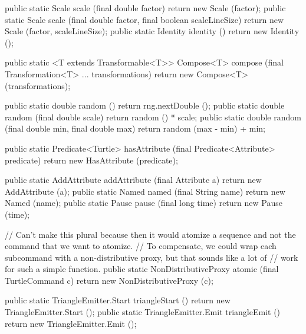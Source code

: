 \documentclass{report}
\begin{document}
\begin{javacode}
{  public static Scale scale (final double factor)                              {return new Scale (factor);}
  public static Scale scale (final double factor, final boolean scaleLineSize) {return new Scale (factor, scaleLineSize);}
  public static Identity identity ()                                           {return new Identity ();}

  public static <T extends Transformable<T>> Compose<T> compose (final Transformation<T> ... transformations)
    {return new Compose<T> (transformations);}

  public static double random ()                                   {return rng.nextDouble ();}
  public static double random (final double scale)                 {return random () * scale;}
  public static double random (final double min, final double max) {return random (max - min) + min;}

  public static Predicate<Turtle> hasAttribute (final Predicate<Attribute> predicate) {
    return new HasAttribute (predicate);
  }

  public static AddAttribute addAttribute (final Attribute a) {return new AddAttribute (a);}
  public static Named        named        (final String name) {return new Named (name);}
  public static Pause        pause        (final long time)   {return new Pause (time);}

  // Can't make this plural because then it would atomize a sequence and not the command that we want to atomize.
  // To compensate, we could wrap each subcommand with a non-distributive proxy, but that sounds like a lot of
  // work for such a simple function.
  public static NonDistributiveProxy atomic (final TurtleCommand c) {return new NonDistributiveProxy (c);}

  public static TriangleEmitter.Start triangleStart () {return new TriangleEmitter.Start ();}
  public static TriangleEmitter.Emit  triangleEmit  () {return new TriangleEmitter.Emit  ();}
}
\end{javacode}
\end{document}
